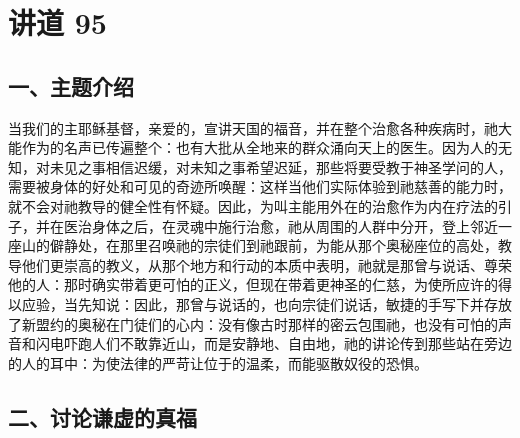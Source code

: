 

\section{讲道 95}

 \par


\subsection{一、主题介绍}

当我们的主耶稣基督，亲爱的，宣讲天国的福音，并在整个治愈各种疾病时，祂大能作为的名声已传遍整个：也有大批从全地来的群众涌向天上的医生。因为人的无知，对未见之事相信迟缓，对未知之事希望迟延，那些将要受教于神圣学问的人，需要被身体的好处和可见的奇迹所唤醒：这样当他们实际体验到祂慈善的能力时，就不会对祂教导的健全性有怀疑。因此，为叫主能用外在的治愈作为内在疗法的引子，并在医治身体之后，在灵魂中施行治愈，祂从周围的人群中分开，登上邻近一座山的僻静处，在那里召唤祂的宗徒们到祂跟前，为能从那个奥秘座位的高处，教导他们更崇高的教义，从那个地方和行动的本质中表明，祂就是那曾与说话、尊荣他的人：那时确实带着更可怕的正义，但现在带着更神圣的仁慈，为使所应许的得以应验，当先知说：因此，那曾与说话的，也向宗徒们说话，敏捷的手写下并存放了新盟约的奥秘在门徒们的心内：没有像古时那样的密云包围祂，也没有可怕的声音和闪电吓跑人们不敢靠近山，而是安静地、自由地，祂的讲论传到那些站在旁边的人的耳中：为使法律的严苛让位于的温柔，而能驱散奴役的恐惧。\par


\subsection{二、讨论谦虚的真福}

